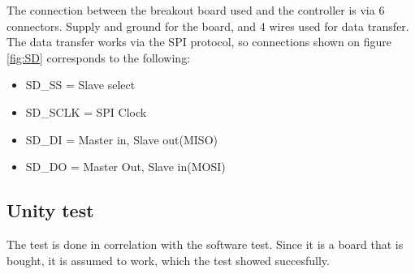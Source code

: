 The connection between the breakout board  used and the controller is via 6 connectors. Supply and ground for the board, and 4 wires used for data transfer. The data transfer works via the SPI protocol, so connections shown on figure \vref{fig:SD} corresponds to the following:

\begin{itemize}
	\item{SD\_SS = Slave select}
	\item{SD\_SCLK = SPI Clock}
	\item{SD\_DI = Master in, Slave out(MISO)}
	\item{SD\_DO = Master Out, Slave in(MOSI)}
\end{itemize}

\subsection{Unity test}
The test is done in correlation with the software test. Since it is a board that is bought, it is assumed to work, which the test showed succesfully. 